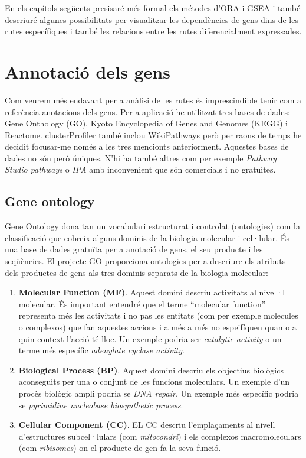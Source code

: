 \begin{itemize}
En els capítols següents presisaré més formal els métodes d'ORA i GSEA i també descriuré algunes possibilitats per visualitzar les dependències de gens dins de les rutes específiques i també les relacions entre les rutes diferencialment expressades.

\end{itemize}


\section{Annotació dels gens}

Com veurem més endavant per a anàlisi de les rutes és imprescindible tenir com a referència anotacions dels gens. Per a aplicació he utilitzat tres bases de dades: Gene Onthology (GO), Kyoto Encyclopedia of Genes and Genomes (KEGG) i Reactome. clusterProfiler també inclou WikiPathways però per raons de temps he decidit focusar-me només a les tres mencionts anteriorment. Aquestes bases de dades no són però úniques. N'hi ha també altres com per exemple \textit{Pathway Studio pathways} o \textit{IPA} amb inconvenient que són comercials i no gratuites. 

\subsection{Gene ontology}
Gene Ontology \cite{gene2004gene} dona tan un vocabulari estructurat i controlat (ontologies) com la classificació que cobreix alguns dominis de la biologia molecular i cel·lular. És una base de dades gratuïta per a anotació de gens, el seu producte i les seqüències. El projecte GO proporciona ontologies per a descriure els atributs dels productes de gens als tres dominis separats de la biologia molecular:
\begin{enumerate}
\item \textbf{Molecular Function (MF)}. Aquest domini descriu activitats al nivel·l molecular. És important entendré que el terme ``molecular function'' representa més les activitats i no pas les entitats (com per exemple molecules o complexos) que fan aquestes accions i a més a més no espeifíquen quan o a quin context l'acció té lloc. Un exemple podria ser \textit{catalytic activity} o un terme més específic \textit{adenylate cyclase activity}.
\item \textbf{Biological Process (BP)}. Aquest domini descriu els objectius biològics aconseguits per una o conjunt de les funcions moleculars. Un exemple d'un procès biològic ampli podria se \textit{DNA repair}. Un exemple més específic podria se \textit{pyrimidine nucleobase biosynthetic process}. 
\item \textbf{Cellular Component (CC)}. EL CC descriu l'emplaçaments al nivell d'estructures subcel·lulars (com \textit{mitocondri}) i els complexos macromoleculars (com \textit{ribisomes}) on el producte de gen fa la seva funció.
\end{enumerate}

